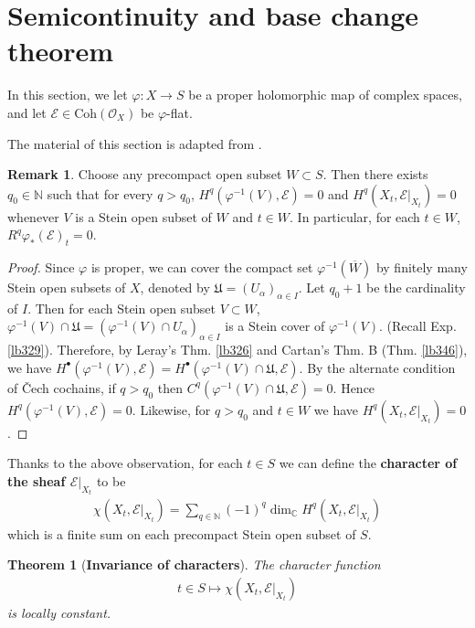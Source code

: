 \documentclass[12pt,b5paper,notitlepage]{report}
\theoremstyle{definition}
\newtheorem{rem}[df]{Remark}
\theoremstyle{plain}
\newtheorem{thm}[df]{Theorem}
\newcommand{\fk}{\mathfrak}
\newcommand{\ovl}{\overline}
\newcommand{\scr}{\mathscr}
\newcommand{\blt}{\bullet}
\newcommand{\Cbb}{\mathbb C}
\newcommand{\Nbb}{\mathbb N}
\newcommand{\Coh}{\mathrm{Coh}}
\numberwithin{equation}{section}
\begin{document}
\section{Semicontinuity and base change theorem} \label{lb358}


In this section, we let $\varphi:X\rightarrow S$ be a proper holomorphic map of complex spaces, and let $\scr E\in\Coh(\scr O_X)$ be  $\varphi$-flat.

The material of this section is adapted from \cite[Sec. 10.5]{GR-b}.





\begin{rem}\label{lb348}
Choose any precompact open subset $W\subset S$. Then there exists $q_0\in\Nbb$ such that for every $q> q_0$, $H^q(\varphi^{-1}(V),\scr E)=0$ and $H^q(X_t,\scr E|_{X_t})=0$ whenever $V$ is a Stein open subset of $W$ and $t\in W$. In particular, for each $t\in W$, $R^q\varphi_*(\scr E)_t=0$.
\end{rem}


\begin{proof}
Since $\varphi$ is proper, we can cover the compact set $\varphi^{-1}(\ovl W)$ by finitely many Stein open subsets of $X$, denoted by $\fk U=(U_\alpha)_{\alpha\in I}$. Let $q_0+1$ be the cardinality of $I$. Then for each Stein open subset $V\subset W$, $\varphi^{-1}(V)\cap\fk U=(\varphi^{-1}(V)\cap U_\alpha)_{\alpha\in I}$ is a Stein cover of $\varphi^{-1}(V)$. (Recall Exp. \ref{lb329}). Therefore, by Leray's Thm. \ref{lb326} and Cartan's Thm. B  (Thm. \ref{lb346}), we have $H^\blt(\varphi^{-1}(V),\scr E)=H^\blt(\varphi^{-1}(V)\cap\fk U,\scr E)$. By the alternate condition of \v Cech cochains, if $q> q_0$ then $C^q(\varphi^{-1}(V)\cap\fk U,\scr E)=0$. Hence $H^q(\varphi^{-1}(V),\scr E)=0$. Likewise, for $q> q_0$ and $t\in W$ we have $H^q(X_t,\scr E|_{X_t})=0$.
\end{proof}



Thanks to the above observation, for each $t\in S$ we can define the \textbf{character of the sheaf $\scr E\vert_{X_t}$} \index{zz@$\chi(X,\scr E)=\sum_q (-1)^q\dim_\Cbb H^q(X,\scr E)$} to be
\begin{align*}
\chi(X_t,\scr E|_{X_t})=\sum_{q\in\Nbb}(-1)^q\dim_\Cbb H^q(X_t,\scr E|_{X_t})
\end{align*}
which is a finite sum on each precompact Stein open subset of $S$.


\begin{thm}[\textbf{Invariance of characters}]
The character function
\begin{align*}
t\in S\mapsto \chi(X_t,\scr E|_{X_t})
\end{align*}
is locally constant.
\end{thm}
\end{document}
